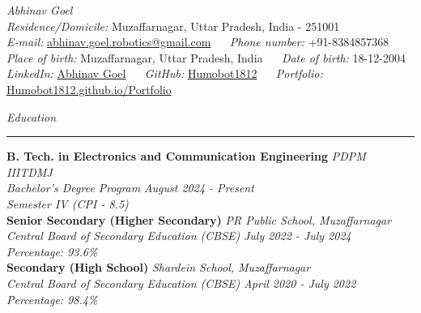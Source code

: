 \documentclass[10pt,a4paper]{article}
\newcommand{\cvsection}[1]{%
  \vspace{7pt}%
  {\color{cvblue}\itshape\large #1}\\[-4pt]%
  {\color{cvblue}\rule{\textwidth}{0.75pt}}\vspace{3pt}%
}
\begin{document}
\begin{center}
  {\Huge\itshape\color{cvblue} Abhinav Goel}\\[4pt]
  \textit{Residence/Domicile:} Muzaffarnagar, Uttar Pradesh, India - 251001\\
  \textit{E-mail:} \href{mailto:abhinav.goel.robotics@gmail.com}{abhinav.goel.robotics@gmail.com} \ \textcolor{cvblue}{} \ \textit{Phone number:} +91-8384857368\\
  \textit{Place of birth:} Muzaffarnagar, Uttar Pradesh, India \ \textcolor{cvblue}{} \ \textit{Date of birth:} 18-12-2004\\
  \textit{LinkedIn:} \href{https://www.linkedin.com/in/abhinav-g-1b878a2b5}{Abhinav Goel} \ \textcolor{cvblue}{} \ \textit{GitHub:} \href{https://github.com/Humobot1812}{Humobot1812} \ \textcolor{cvblue}{} \ \textit{Portfolio:} \href{https://Humobot1812.github.io/Portfolio/}{Humobot1812.github.io/Portfolio}
\end{center}

\cvsection{Education}

\textbf{B. Tech. in Electronics and Communication Engineering} \hfill \textit{PDPM IIITDMJ}\\
\textit{Bachelor's Degree Program} \hfill \textit{August 2024 - Present}\\
\textit{Semester IV (CPI - 8.5)}\\[4pt]

\textbf{Senior Secondary (Higher Secondary)} \hfill \textit{PR Public School, Muzaffarnagar}\\
\textit{Central Board of Secondary Education (CBSE)} \hfill \textit{July 2022 - July 2024}\\
\textit{Percentage: 93.6\%}\\[4pt]

\textbf{Secondary (High School)} \hfill \textit{Shardein School, Muzaffarnagar}\\
\textit{Central Board of Secondary Education (CBSE)} \hfill \textit{April 2020 - July 2022}\\
\textit{Percentage: 98.4\%}
\end{document}
